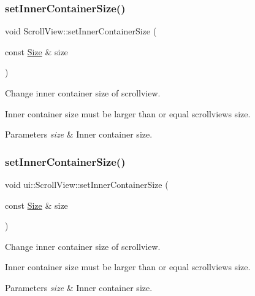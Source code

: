 \subsubsection{\texorpdfstring{set\+Inner\+Container\+Size()}{setInnerContainerSize()}\hspace{0.1cm}{\footnotesize\ttfamily [1/2]}}
{\footnotesize\ttfamily void Scroll\+View\+::set\+Inner\+Container\+Size (\begin{DoxyParamCaption}\item[{const \hyperlink{classSize}{Size} \&}]{size }\end{DoxyParamCaption})}

Change inner container size of scrollview.

Inner container size must be larger than or equal scrollview\textquotesingle{}s size.


\begin{DoxyParams}{Parameters}
{\em size} & Inner container size. \\
\hline
\end{DoxyParams}
\mbox{\label{classui_1_1ScrollView_ac91621ddfb9c7dfa6a1143a4a95e233e}} 
\subsubsection{\texorpdfstring{set\+Inner\+Container\+Size()}{setInnerContainerSize()}\hspace{0.1cm}{\footnotesize\ttfamily [2/2]}}
{\footnotesize\ttfamily void ui\+::\+Scroll\+View\+::set\+Inner\+Container\+Size (\begin{DoxyParamCaption}\item[{const \hyperlink{classSize}{Size} \&}]{size }\end{DoxyParamCaption})}

Change inner container size of scrollview.

Inner container size must be larger than or equal scrollview\textquotesingle{}s size.


\begin{DoxyParams}{Parameters}
{\em size} & Inner container size. \\
\hline
\end{DoxyParams}
\mbox{\label{classui_1_1ScrollView_a3dc215785981958746d0e12ef5ce5d92}} 
